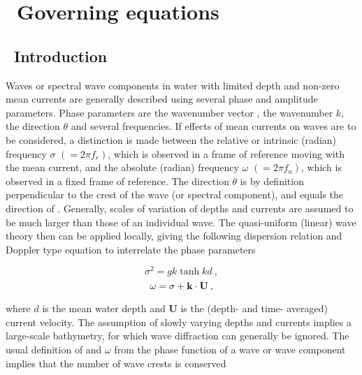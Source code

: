 \section{~Governing equations} \label{chapt:eq}
\newcounters
\vssub
\subsection{~Introduction}
\vssub

Waves or spectral wave components in water with limited depth and non-zero
mean currents are generally described using several phase and amplitude
parameters. Phase parameters are the wavenumber vector {\bk}, the wavenumber
$k$, the direction $\theta$ and several frequencies. If effects of mean
currents on waves are to be considered, a distinction is made between the
relative or intrinsic (radian) frequency $\sigma$ $(= 2 \pi f_r)$, which is
observed in a frame of reference moving with the mean current, and the
absolute (radian) frequency $\omega$ $(= 2 \pi f_a)$, which is observed in a
fixed frame of reference.  The direction $\theta$ is by definition
perpendicular to the crest of the wave (or spectral component), and equals the
direction of {\bk}. Generally, scales of variation of depths and currents are
assumed to be much larger than those of an individual wave. The quasi-uniform
(linear) wave theory then can be applied locally, giving the following
dispersion relation and Doppler type equation to interrelate the phase
parameters


\begin{equation}
\sigma ^2 = g k \tanh kd \: ,
\label{eq:disp}
\end{equation}
\begin{equation}
\omega = \sigma + {\mbox{\bf k}} \cdot {\bf U} \: ,
\label{eq:doppler}
\end{equation}

\noindent
where $d$ is the mean water depth and {\bf U} is the (depth- and time-
averaged) current velocity. The assumption of slowly varying depths and
currents implies a large-scale bathymetry, for which wave diffraction can
generally be ignored. The usual definition of {\bk} and $\omega$ from the
phase function of a wave or wave component implies that the number of wave
crests is conserved \citep[see, e.g.,][]{bk:Phi77,bk:Mei83}



